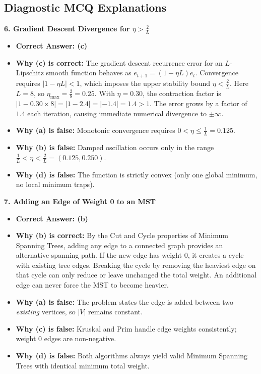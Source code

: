 \subsection*{Diagnostic MCQ Explanations}

\textbf{6. Gradient Descent Divergence for $\eta > \frac{2}{L}$}
\begin{itemize}
    \item \textbf{Correct Answer: (c)}
    \item \textbf{Why (c) is correct:} The gradient descent recurrence error for an $L$-Lipschitz smooth function behaves as $e_{t+1} = (1 - \eta L) e_t$. Convergence requires $|1 - \eta L| < 1$, which imposes the upper stability bound $\eta < \frac{2}{L}$. Here $L = 8$, so $\eta_{\text{max}} = \frac{2}{8} = 0.25$. With $\eta = 0.30$, the contraction factor is $|1 - 0.30 \times 8| = |1 - 2.4| = |-1.4| = 1.4 > 1$. The error grows by a factor of $1.4$ each iteration, causing immediate numerical divergence to $\pm \infty$.
    \item \textbf{Why (a) is false:} Monotonic convergence requires $0 < \eta \le \frac{1}{L} = 0.125$.
    \item \textbf{Why (b) is false:} Damped oscillation occurs only in the range $\frac{1}{L} < \eta < \frac{2}{L} = (0.125, 0.250)$.
    \item \textbf{Why (d) is false:} The function is strictly convex (only one global minimum, no local minimum traps).
\end{itemize}

\textbf{7. Adding an Edge of Weight 0 to an MST}
\begin{itemize}
    \item \textbf{Correct Answer: (b)}
    \item \textbf{Why (b) is correct:} By the Cut and Cycle properties of Minimum Spanning Trees, adding any edge to a connected graph provides an alternative spanning path. If the new edge has weight 0, it creates a cycle with existing tree edges. Breaking the cycle by removing the heaviest edge on that cycle can only reduce or leave unchanged the total weight. An additional edge can never force the MST to become heavier.
    \item \textbf{Why (a) is false:} The problem states the edge is added between two \textit{existing} vertices, so $|V|$ remains constant.
    \item \textbf{Why (c) is false:} Kruskal and Prim handle edge weights consistently; weight 0 edges are non-negative.
    \item \textbf{Why (d) is false:} Both algorithms always yield valid Minimum Spanning Trees with identical minimum total weight.
\end{itemize}
